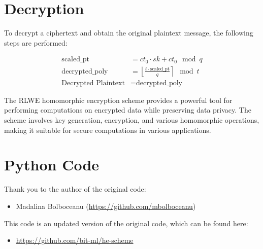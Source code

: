 \documentclass{article}
\begin{document}
\section{Decryption}

To decrypt a ciphertext and obtain the original plaintext message, the following steps are performed:

\begin{align*}
    \text{scaled\_pt} &= ct_0 \cdot sk + ct_0 \mod q \\
    \text{decrypted\_poly} &= \left\lfloor \frac{t \cdot \text{scaled\_pt}}{q} \right\rceil \mod t \\
    \text{Decrypted Plaintext} &= \text{decrypted\_poly}
\end{align*}

The RLWE homomorphic encryption scheme provides a powerful tool for performing computations on encrypted data while preserving data privacy. The scheme involves key generation, encryption, and various homomorphic operations, making it suitable for secure computations in various applications.

\section{Python Code}

Thank you to the author of the original code:
\begin{itemize}
    \item Madalina Bolboceanu (\url{https://github.com/mbolboceanu})
\end{itemize}

This code is an updated version of the original code, which can be found here:
\begin{itemize}
    \item \url{https://github.com/bit-ml/he-scheme}
\end{itemize}

\pagebreak
\end{document}
